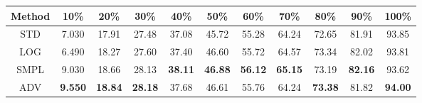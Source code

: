 \documentclass{standalone}
\begin{document}
\begin{tabular}{c|cccccccccc}
      \toprule
      Method & 10\% & 20\% & 30\% & 40\% & 50\% & 60\% & 70\% & 80\% & 90\% & 100\% \\
      \midrule
STD & 7.030 & 17.91 & 27.48 & 37.08 & 45.72 & 55.28 & 64.24 & 72.65 & 81.91 & 93.85\\
LOG & 6.490 & 18.27 & 27.60 & 37.40 & 46.60 & 55.72 & 64.57 & 73.34 & 82.02 & 93.81\\
SMPL & 9.030 & 18.66 & 28.13 & \textbf{38.11} & \textbf{46.88} & \textbf{56.12} & \textbf{65.15} & 73.19 & \textbf{82.16} & 93.62\\
ADV & \textbf{9.550} & \textbf{18.84} & \textbf{28.18} & 37.68 & 46.61 & 55.76 & 64.24 & \textbf{73.38} & 81.82 & \textbf{94.00}\\
  \bottomrule
\end{tabular}
\end{document}
